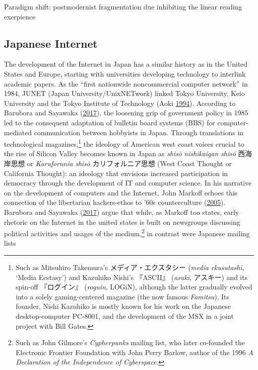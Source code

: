 \documentclass[10pt,british,A4paper,,openany]{memoir}
\begin{document}
Paradigm shift: postmodernist fragmentation due inhibiting the linear
reading exerpience

\subsection{Japanese Internet}\label{japanese-internet}

The development of the Internet in Japan has a similar history as in the
United States and Europe, starting with universities developing
technology to interlink academic papers. As the ``first nationwide
noncommercial computer network'' in 1984, JUNET (Japan
University/UnixNETwork) linked Tokyo University, Keio University and the
Tokyo Institute of Technology (Aoki
\protect\hyperlink{ref-aoki_virtual_1994}{1994}). According to Barubora
and Sayawaka (\protect\hyperlink{ref-barubora_eng:_2017}{2017}), the
loosening grip of government policy in 1985 led to the consequent
adaptation of bulletin board systems (BBS) for computer-mediated
communication between hobbyists in Japan. Through translations in
technological magazines,\footnote{Such as Mitsuhiro Takemura's
  メディア・エクスタシー (\emph{media ekusutashī}, `Media Ecstasy') and
  Kazuhiko Nishi's 『ASCII』 (\emph{asukī}, アスキー) and its spin-off
  『ログイン』 (\emph{roguin}, LOGiN), although the latter gradually
  evolved into a solely gaming-centered magazine (the now famous
  \emph{Famitsu}). Its founder, Nishi Kazuhiko is mostly known for his
  work on the Japanese desktop-computer PC-8001, and the development of
  the MSX in a joint project with Bill Gates.} the ideology of American
west coast voices crucial to the rise of Silicon Valley becomes known in
Japan as \emph{shisō nishikaigan shisō} 西海岸思想 or \emph{Karuforunia
shisō} カリフォルニア思想 (West Coast Thought or California Thought): an
ideology that envisions increased participation in democracy through the
development of IT and computer science. In his narrative on the
development of computers and the Internet, John Markoff echoes this
connection of the libertarian hackers-ethos to '60s counterculture
(\protect\hyperlink{ref-markoff_what_2005}{2005}). Barubora and Sayawaka
(\protect\hyperlink{ref-barubora_eng:_2017}{2017}) argue that while, as
Markoff too states, early rhetoric on the Internet in the united states
is built on newsgroups discussing political activities and usages of the
medium,\footnote{Such as John Gilmore's \emph{Cypherpunks} mailing list,
  who later co-founded the Electronic Frontier Foundation with John
  Perry Barlow, author of the 1996 \emph{A Declaration of the
  Independence of Cyberspace}.} in contrast were Japanese mailing lists
\end{document}
